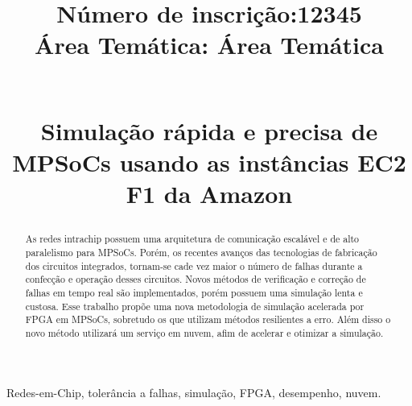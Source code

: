\documentclass[conference]{IEEEtran}
\begin{document}
	
	\title{
		{
			\begin{flushleft}
				\normalsize{\textbf{Número de inscrição:}12345\\ 
					\textbf{Área Temática:} Área Temática} 
			\end{flushleft}
			\vspace*{-1cm}	{\footnotesize \textsuperscript{}}}\\
		Simulação rápida e precisa de MPSoCs usando as instâncias EC2 F1 da Amazon\\
	}
	\maketitle
	
	\renewcommand{\abstractname}{Resumo}
	\begin{abstract}
		As redes intrachip possuem uma arquitetura de
		comunicação escalável e de alto paralelismo para MPSoCs. Porém, os recentes  avanços das tecnologias de fabricação dos circuitos integrados, tornam-se cade vez maior o número de falhas durante a confecção e operação desses circuitos. Novos métodos de verificação e correção de falhas em tempo real são implementados, porém possuem uma simulação lenta e custosa. Esse trabalho propõe uma nova metodologia de simulação acelerada por FPGA em MPSoCs, sobretudo os que utilizam métodos resilientes a erro. Além disso o novo método utilizará um serviço em nuvem, afim de acelerar e otimizar a simulação.
	\end{abstract}
	
	
	\renewcommand{\IEEEkeywordsname}{Palavras-chave}
	\begin{IEEEkeywords}
		Redes-em-Chip, tolerância a falhas, simulação, FPGA, desempenho, nuvem.
	\end{IEEEkeywords}
	
\end{document}
